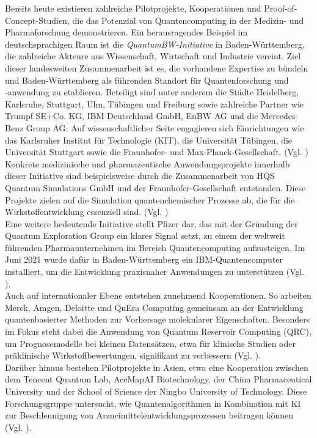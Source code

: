 Bereits heute existieren zahlreiche Pilotprojekte, Kooperationen und Proof-of-Concept-Studien, die das Potenzial von Quantencomputing in der Medizin- und Pharmaforschung demonstrieren. Ein herausragendes Beispiel im deutschsprachigen Raum ist die \textit{QuantumBW-Initiative} in Baden-Württemberg, die zahlreiche Akteure aus Wissenschaft, Wirtschaft und Industrie vereint. Ziel dieser landesweiten Zusammenarbeit ist es, die vorhandene Expertise zu bündeln und Baden-Württemberg als führenden Standort für Quantenforschung und ‑anwendung zu etablieren. Beteiligt sind unter anderem die Städte Heidelberg, Karlsruhe, Stuttgart, Ulm, Tübingen und Freiburg sowie zahlreiche Partner wie Trumpf SE+Co. KG, IBM Deutschland GmbH, EnBW AG und die Mercedes-Benz Group AG. Auf wissenschaftlicher Seite engagieren sich Einrichtungen wie das Karlsruher Institut für Technologie (KIT), die Universität Tübingen, die Universität Stuttgart sowie die Fraunhofer- und Max-Planck-Gesellschaft. (Vgl. \cite{noauthor_partner_nodate})
Konkrete medizinische und pharmazeutische Anwendungsprojekte innerhalb dieser Initiative sind beispielsweise durch die Zusammenarbeit von HQS Quantum Simulations GmbH und der Fraunhofer-Gesellschaft entstanden. Diese Projekte zielen auf die Simulation quantenchemischer Prozesse ab, die für die Wirkstoffentwicklung essenziell sind. (Vgl. \cite{fraunhofer_iais_quantum_2023})\\
Eine weitere bedeutende Initiative stellt Pfizer dar, das mit der Gründung der Quantum Exploration Group ein klares Signal setzt, zu einem der weltweit führenden Pharmaunternehmen im Bereich Quantencomputing aufzusteigen. Im Juni 2021 wurde dafür in Baden-Württemberg ein IBM-Quantencomputer installiert, um die Entwicklung praxisnaher Anwendungen zu unterstützen (Vgl. \cite{papalitsas_quantum_2025}).\\
Auch auf internationaler Ebene entstehen zunehmend Kooperationen. So arbeiten Merck, Amgen, Deloitte und QuEra Computing gemeinsam an der Entwicklung quantenbasierter Methoden zur Vorhersage molekularer Eigenschaften. Besonders im Fokus steht dabei die Anwendung von Quantum Reservoir Computing (QRC), um Prognosemodelle bei kleinen Datensätzen, etwa für klinische Studien oder präklinische Wirkstoffbewertungen, signifikant zu verbessern (Vgl. \cite{beaulieu_robust_2024, kornjaca_large-scale_2024}).\\
Darüber hinaus bestehen Pilotprojekte in Asien, etwa eine Kooperation zwischen dem Tencent Quantum Lab, AceMapAI Biotechnology, der China Pharmaceutical University und der School of Science der Ningbo University of Technology. Diese Forschungsgruppe untersucht, wie Quantenalgorithmen in Kombination mit KI zur Beschleunigung von Arzneimittelentwicklungsprozessen beitragen können (Vgl. \cite{li_hybrid_2024}).\\

